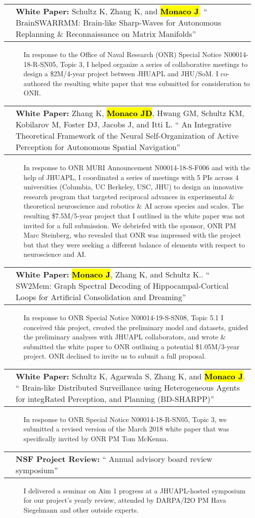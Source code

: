 \documentclass[10pt]{article}
\makeatletter
\newcommand{\unpubtitle}[1]{{\color{hopkinsblue} #1}}
\newcommand{\joehl}[1]{\hl{\textbf{#1}}}
\newcommand{\researchnote}[1]{
  \begin{description}
    \item[] {\hspace{2.2ex}\color{darkgray} #1}
  \end{description}
}
\newcommand{\researchactivity}[4]{
  \begin{minipage}[t]{\textwidth}
    \begin{tabular}{@{\hspace{2ex}}l>{\raggedright\arraybackslash}p{.8\textwidth}}
      \makebox[1.2in][l]{#1} & \textbf{#2:}
      ``\unpubtitle{#3}'' 
    \end{tabular}
  \researchnote{\hspace{1ex} #4}
  \end{minipage}
  \medbreak
}
\newcommand{\whitepaper}[4]{
  \begin{minipage}[t]{\textwidth}
    \begin{tabular}{@{\hspace{2ex}}l>{\raggedright\arraybackslash}p{.8\textwidth}}
      \makebox[1.2in][l]{#1} & \textbf{White Paper:} #2.
      ``\unpubtitle{#3}'' 
    \end{tabular}
  \researchnote{\hspace{1ex} #4}
  \end{minipage}
  \medbreak
}
\makeatother
\begin{document}
\whitepaper
{Feb.--Mar. 2018}
{Schultz K, Zhang K, and \joehl{Monaco J}}
{BrainSWARRMM: Brain-like Sharp-Waves for Autonomous Replanning \&
Reconnaissance on Matrix Manifolds}
{In response to the Office of Naval Research (ONR) Special Notice
  N00014-18-R-SN05, Topic 3, I helped organize a series of collaborative meetings
  to design a \$2M/4-year project between JHUAPL and JHU/SoM. I co-authored the
resulting white paper that was submitted for consideration to ONR.}

\whitepaper
{May--June 2018}
{Zhang K, \joehl{Monaco JD}, Hwang GM, Schultz KM, Kobilarov M, Foster DJ,
Jacobs J, and Itti L}
{An Integrative Theoretical Framework of the Neural Self-Organization of Active
Perception for Autonomous Spatial Navigation}
{In response to ONR MURI Announcement N00014-18-S-F006 and with the help of
  JHUAPL, I coordinated a series of meetings with 5 PIs across 4 universities
  (Columbia, UC Berkeley, USC, JHU) to design an innovative research program that
  targeted reciprocal advances in experimental \& theoretical neuroscience and
  robotics \& AI across species and scales. The resulting \$7.5M/5-year project
  that I outlined in the white paper was not invited for a full submission. We
  debriefed with the sponsor, ONR PM Marc Steinberg, who revealed that ONR was
  impressed with the project but that they were seeking a different balance of
elements with respect to neuroscience and AI.}

\whitepaper
{August 2019}
{\joehl{Monaco J}, Zhang K, and Schultz K.}
{SW2Mem: Graph Spectral Decoding of Hippocampal-Cortical Loops for Artificial
Consolidation and Dreaming}
{In response to ONR Special Notice N00014-19-S-SN08, Topic 5.1 I conceived this
  project, created the preliminary model and datasets, guided the preliminary
  analyses with JHUAPL collaborators, and wrote \& submitted the white paper to
  ONR outlining a potential \$1.05M/3-year project. ONR declined to invite us to
submit a full proposal.}

\whitepaper
{August 2019}
{Schultz K, Agarwala S, Zhang K, and \joehl{Monaco J}}
{Brain-like Distributed Surveillance using Heterogeneous Agents for integRated
Perception, and Planning (BD-SHARPP)}
{In response to ONR Special Notice N00014-18-R-SN05, Topic 3, we submitted a
  revised version of the March 2018 white paper that was specifically invited by
ONR PM Tom McKenna.}

\researchactivity
{Sept. 11, 2019}
{NSF Project Review}
{Annual advisory board review symposium}
{I delivered a seminar on Aim 1 progress at a JHUAPL-hosted symposium for our
  project’s yearly review, attended by DARPA/I2O PM Hava Siegelmann and other
outside experts.}
\end{document}
